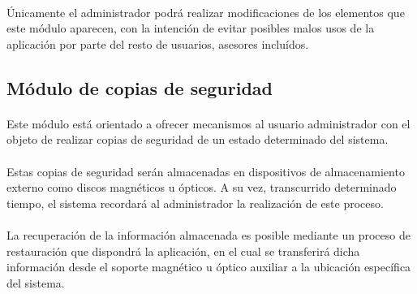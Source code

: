       \paragraph{}Únicamente el administrador podrá realizar modificaciones de
      los elementos que este módulo aparecen, con la intención de evitar
      posibles malos usos de la aplicación por parte del resto de usuarios,
      asesores incluídos.

   \subsection{Módulo de copias de seguridad}

      \paragraph{}Este módulo está orientado a ofrecer mecanismos al usuario
      administrador con el objeto de realizar copias de seguridad de un
      estado determinado del sistema.

      \paragraph{}Estas copias de seguridad serán almacenadas en dispositivos
      de almacenamiento externo como discos magnéticos u ópticos. A su vez,
      transcurrido determinado tiempo, el sistema recordará al administrador
      la realización de este proceso.

      \paragraph{}La recuperación de la información almacenada es posible
      mediante un proceso de restauración que dispondrá la aplicación, en el
      cual se transferirá dicha información desde el soporte magnético u
      óptico auxiliar a la ubicación específica del sistema.
